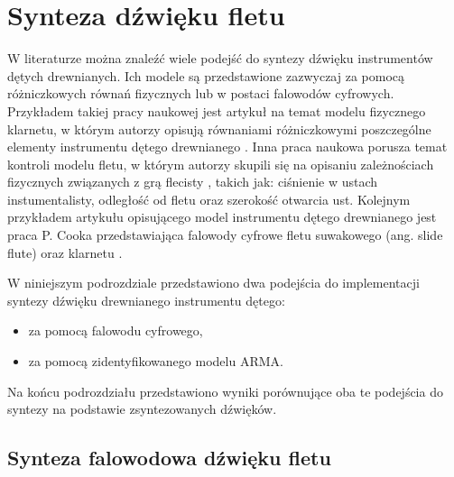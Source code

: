 \section{Synteza dźwięku fletu}

W literaturze można znaleźć wiele podejść do syntezy dźwięku instrumentów dętych drewnianych. Ich modele są przedstawione zazwyczaj za pomocą różniczkowych równań fizycznych lub w postaci falowodów cyfrowych. 
Przykładem takiej pracy naukowej jest artykuł na temat modelu fizycznego klarnetu, w którym autorzy opisują równaniami różniczkowymi poszczególne elementy instrumentu dętego drewnianego \cite{flute_klarnet}. Inna praca naukowa porusza temat kontroli modelu fletu, w którym autorzy skupili się na opisaniu zależnościach fizycznych związanych z grą flecisty \cite{flute_flecista}, takich jak: ciśnienie w ustach instumentalisty, odległość od fletu oraz szerokość otwarcia ust. Kolejnym przykładem artykułu opisującego model instrumentu dętego drewnianego jest praca P. Cooka przedstawiająca falowody cyfrowe fletu suwakowego (ang. slide flute) oraz klarnetu \cite{flute_cook}.



W niniejszym podrozdziale przedstawiono dwa podejścia do implementacji syntezy dźwięku drewnianego instrumentu dętego:
\begin{itemize}
	\setlength\itemsep{-3pt}
	\item za pomocą falowodu cyfrowego,
	\item za pomocą zidentyfikowanego modelu ARMA.
\end{itemize}
Na końcu podrozdziału przedstawiono wyniki porównujące oba te podejścia do syntezy na podstawie zsyntezowanych dźwięków.

\subsection{Synteza falowodowa dźwięku fletu}

